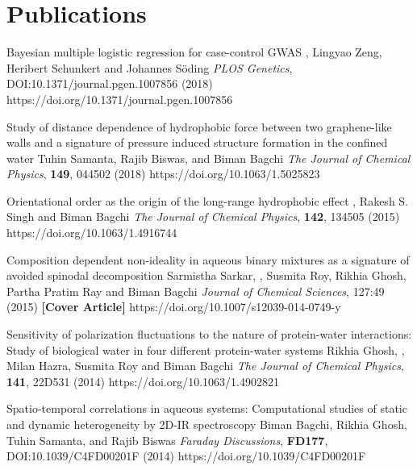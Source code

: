 \section{Publications}
%
        {Bayesian multiple logistic regression for case-control GWAS}
        {\selfauthor{}, Lingyao Zeng, Heribert Schunkert and Johannes S\"oding}
        {{\slshape PLOS Genetics}, DOI:10.1371/journal.pgen.1007856 (2018)}
        {https://doi.org/10.1371/journal.pgen.1007856}

%
        {Study of distance dependence of hydrophobic force between two graphene-like walls and a signature of pressure induced structure formation in the confined water}
        {Tuhin Samanta, Rajib Biswas, \selfauthor{} and Biman Bagchi}
        {{\slshape The Journal of Chemical Physics}, {\bfseries 149}, 044502 (2018)}
        {https://doi.org/10.1063/1.5025823}

%
        {Orientational order as the origin of the long-range hydrophobic effect}
        {\selfauthor{}, Rakesh S. Singh and Biman Bagchi}
        {{\slshape The Journal of Chemical Physics}, {\bfseries 142}, 134505 (2015)}
        {https://doi.org/10.1063/1.4916744}

%
        {Composition dependent non-ideality in aqueous binary mixtures
        as a signature of avoided spinodal decomposition}
        {Sarmistha Sarkar, \selfauthor{}, Susmita Roy, Rikhia Ghosh, Partha Pratim Ray and Biman Bagchi}
        {{\slshape Journal of Chemical Sciences}, 127:49 (2015) {\bfseries [Cover Article]}}
        {https://doi.org/10.1007/s12039-014-0749-y}

%
        {Sensitivity of polarization fluctuations to the nature of protein-water interactions:
        Study of biological water in four different protein-water systems}
        {Rikhia Ghosh, \selfauthor{}, Milan Hazra, Susmita Roy and Biman Bagchi}
        {{\slshape The Journal of Chemical Physics}, {\bfseries 141}, 22D531 (2014)}
        {https://doi.org/10.1063/1.4902821}

%
        {Spatio-temporal correlations in aqueous systems:
         Computational studies of static and dynamic heterogeneity by 2D-IR spectroscopy}
        {Biman Bagchi, Rikhia Ghosh, Tuhin Samanta, \selfauthor{} and Rajib Biswas}
        {{\slshape Faraday Discussions}, {\bfseries FD177}, DOI:10.1039/C4FD00201F (2014)}
        {https://doi.org/10.1039/C4FD00201F}

